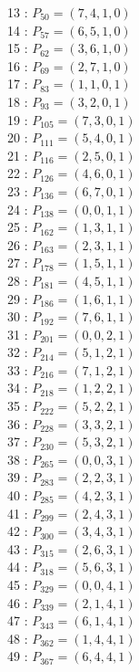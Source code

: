 \documentclass{article}
\begin{document}
{\begin{multicols}{3}
13 : $P_{50}=( 7, 4, 1, 0 )$\\
14 : $P_{57}=( 6, 5, 1, 0 )$\\
15 : $P_{62}=( 3, 6, 1, 0 )$\\
16 : $P_{69}=( 2, 7, 1, 0 )$\\
17 : $P_{83}=( 1, 1, 0, 1 )$\\
18 : $P_{93}=( 3, 2, 0, 1 )$\\
19 : $P_{105}=( 7, 3, 0, 1 )$\\
20 : $P_{111}=( 5, 4, 0, 1 )$\\
21 : $P_{116}=( 2, 5, 0, 1 )$\\
22 : $P_{126}=( 4, 6, 0, 1 )$\\
23 : $P_{136}=( 6, 7, 0, 1 )$\\
24 : $P_{138}=( 0, 0, 1, 1 )$\\
25 : $P_{162}=( 1, 3, 1, 1 )$\\
26 : $P_{163}=( 2, 3, 1, 1 )$\\
27 : $P_{178}=( 1, 5, 1, 1 )$\\
28 : $P_{181}=( 4, 5, 1, 1 )$\\
29 : $P_{186}=( 1, 6, 1, 1 )$\\
30 : $P_{192}=( 7, 6, 1, 1 )$\\
31 : $P_{201}=( 0, 0, 2, 1 )$\\
32 : $P_{214}=( 5, 1, 2, 1 )$\\
33 : $P_{216}=( 7, 1, 2, 1 )$\\
34 : $P_{218}=( 1, 2, 2, 1 )$\\
35 : $P_{222}=( 5, 2, 2, 1 )$\\
36 : $P_{228}=( 3, 3, 2, 1 )$\\
37 : $P_{230}=( 5, 3, 2, 1 )$\\
38 : $P_{265}=( 0, 0, 3, 1 )$\\
39 : $P_{283}=( 2, 2, 3, 1 )$\\
40 : $P_{285}=( 4, 2, 3, 1 )$\\
41 : $P_{299}=( 2, 4, 3, 1 )$\\
42 : $P_{300}=( 3, 4, 3, 1 )$\\
43 : $P_{315}=( 2, 6, 3, 1 )$\\
44 : $P_{318}=( 5, 6, 3, 1 )$\\
45 : $P_{329}=( 0, 0, 4, 1 )$\\
46 : $P_{339}=( 2, 1, 4, 1 )$\\
47 : $P_{343}=( 6, 1, 4, 1 )$\\
48 : $P_{362}=( 1, 4, 4, 1 )$\\
49 : $P_{367}=( 6, 4, 4, 1 )$\\

\end{multicols}}
\end{document}
